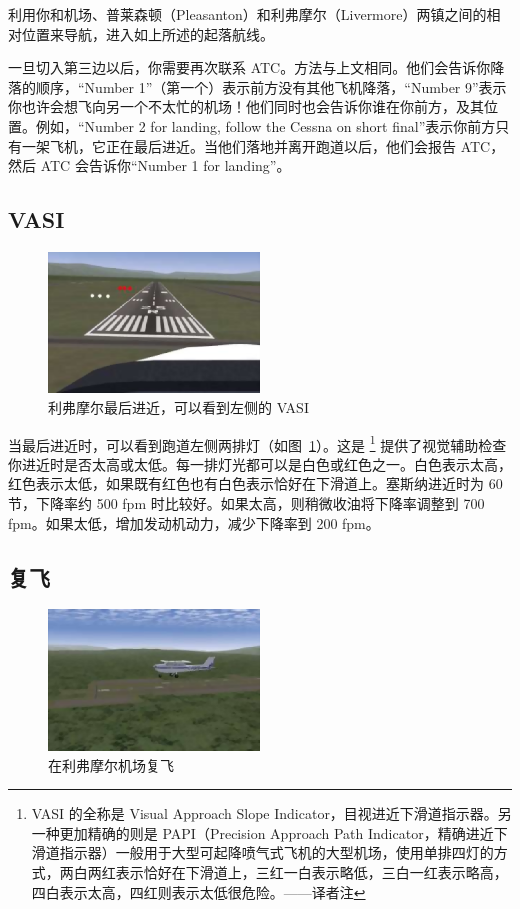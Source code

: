 利用你和机场、普莱森顿（Pleasanton）和利弗摩尔（Livermore）两镇之间的相对位置来导航，进入如上所述的起落航线。

一旦切入第三边以后，你需要再次联系 ATC。方法与上文相同。他们会告诉你降落的顺序，“Number 1”（第一个）表示前方没有其他飞机降落，“Number 9”表示你也许会想飞向另一个不太忙的机场！他们同时也会告诉你谁在你前方，及其位置。例如，“Number 2 for landing, follow the Cessna on short final”表示你前方只有一架飞机，它正在最后进近。当他们落地并离开跑道以后，他们会报告 ATC，然后 ATC 会告诉你“Number 1 for landing”。

\subsection{VASI}

\begin{figure}[!htp]
\centering
\includegraphics[width=0.5\textwidth]{vasi2}
\caption{利弗摩尔最后进近，可以看到左侧的 VASI\label{vasi}}
\end{figure}

当最后进近时，可以看到跑道左侧两排灯（如图~\ref{vasi}）。这是 \footnote{VASI 的全称是 Visual Approach Slope Indicator，目视进近下滑道指示器。另一种更加精确的则是 PAPI（Precision Approach Path Indicator，精确进近下滑道指示器）一般用于大型可起降喷气式飞机的大型机场，使用单排四灯的方式，两白两红表示恰好在下滑道上，三红一白表示略低，三白一红表示略高，四白表示太高，四红则表示太低很危险。——译者注} 提供了视觉辅助检查你进近时是否太高或太低。每一排灯光都可以是白色或红色之一。白色表示太高，红色表示太低，如果既有红色也有白色表示恰好在下滑道上。塞斯纳进近时为 60 节，下降率约 500 fpm 时比较好。如果太高，则稍微收油将下降率调整到 700 fpm。如果太低，增加发动机动力，减少下降率到 200 fpm。

\subsection{复飞}

\begin{figure}[!htp]
\centering
\includegraphics[width=0.5\textwidth]{missed}
\caption{在利弗摩尔机场复飞}
\end{figure}

